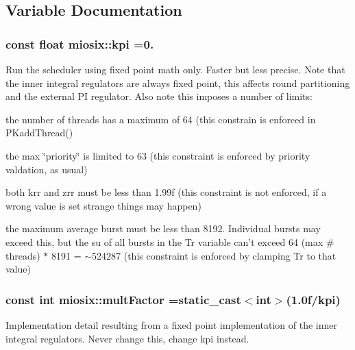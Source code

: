\subsection{Variable Documentation}
\hypertarget{namespacemiosix_ab26854f238450057e4b1eb3687ac4f88}{
\subsubsection[{kpi}]{\setlength{\rightskip}{0pt plus 5cm}const float miosix\-::kpi =0.}}\label{namespacemiosix_ab26854f238450057e4b1eb3687ac4f88}
Run the scheduler using fixed point math only. Faster but less precise. Note that the inner integral regulators are always fixed point, this affects round partitioning and the external P\-I regulator. Also note this imposes a number of limits\-:
\begin{DoxyItemize}
\item the number of threads has a maximum of 64 (this constrain is enforced in P\-Kadd\-Thread()
\item the max \char`\"{}priority\char`\"{} is limited to 63 (this constraint is enforced by priority valdation, as usual)
\item both krr and zrr must be less than 1.\-99f (this constraint is not enforced, if a wrong value is set strange things may happen)
\item the maximum average burst must be less than 8192. Individual bursts may exceed this, but the su of all bursts in the Tr variable can't exceed 64 (max \# threads) $\ast$ 8191 = $\sim$524287 (this constraint is enforced by clamping Tr to that value) 
\end{DoxyItemize}\hypertarget{namespacemiosix_ac4774f319395e90899e2aa549444495b}{
\subsubsection[{mult\-Factor}]{\setlength{\rightskip}{0pt plus 5cm}const int miosix\-::mult\-Factor =static\-\_\-cast$<$int$>$(1.\-0f/kpi)}}\label{namespacemiosix_ac4774f319395e90899e2aa549444495b}
Implementation detail resulting from a fixed point implementation of the inner integral regulators. Never change this, change kpi instead. 